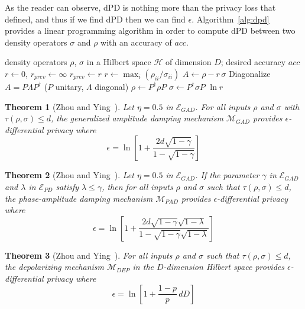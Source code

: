 \documentclass{ieeeaccess}
\newtheorem{theorem}{Theorem}[section]
\begin{document}
As the reader can observe, dPD is nothing more than the privacy loss that~\cite{dwork2014algorithmic} defined, and thus if we find dPD then we can find $\epsilon$. Algorithm~\ref{alg:dpd}~\cite{zhou2017differential} provides a linear programming algorithm in order to compute dPD between two density operators $\sigma$ and $\rho$ with an accuracy of $\mathit{acc}$. 

\begin{algorithm}[!t]
  \caption{Computing $\mathrm{dPD}$ \cite{zhou2017differential}}
  \label{alg:dpd}
  \begin{algorithmic}[1]
    \REQUIRE density operators $\rho$, $\sigma$ in a Hilbert space $\mathcal{H}$ of dimension $D$; desired accuracy $\mathit{acc}$
    \STATE $r \gets 0$, $r_{prev} \gets \infty$
      \STATE $r_{prev} \gets r$
      \STATE $r \gets \max_i (\rho_{ii}/\sigma_{ii})$
      \STATE $A \gets \rho - r\,\sigma$
      \STATE Diagonalize $A = P \Lambda P^{\dagger}$ ($P$ unitary, $\Lambda$ diagonal)
      \STATE $\rho \gets P^{\dagger} \rho P$
      \STATE $\sigma \gets P^{\dagger} \sigma P$
    \ENDWHILE
    \RETURN $\ln r$
  \end{algorithmic}
\end{algorithm}

\begin{theorem}[Zhou and Ying~\cite{zhou2017differential}]
    Let $\eta = 0.5$ in $\mathcal{E}_{GAD}$. For all inputs $\rho$ and $\sigma$ with $\tau(\rho, \sigma) \leq d$, the generalized amplitude damping mechanism $\mathcal{M}_{GAD}$ provides $\epsilon$-differential privacy where
    \[
      \epsilon = \ln\left[1 + \frac{2d\sqrt{1-\gamma}}{1-\sqrt{1-\gamma}}\right]
    \]
    \label{thm:epsilon_gad}
\end{theorem}

\begin{theorem}[Zhou and Ying~\cite{zhou2017differential}]
    Let $\eta = 0.5$ in $\mathcal{E}_{GAD}$. If the parameter $\gamma$ in $\mathcal{E}_{GAD}$ and $\lambda$ in $\mathcal{E}_{PD}$ satisfy $\lambda \leq \gamma$, then for all inputs $\rho$ and $\sigma$ such that $\tau(\rho, \sigma) \leq d$, the phase-amplitude damping mechanism $\mathcal{M}_{PAD}$ provides $\epsilon$-differential privacy where
    \[
      \epsilon = \ln\left[1 + \frac{2d\sqrt{1-\gamma}\sqrt{1-\lambda}}{1-\sqrt{1-\gamma}\sqrt{1-\lambda}}\right]
    \]
    \label{thm:epsilon_pad}
\end{theorem}

\begin{theorem}[Zhou and Ying~\cite{zhou2017differential}]
    For all inputs $\rho$ and $\sigma$ such that $\tau(\rho, \sigma) \leq d$, the depolarizing mechanism $\mathcal{M}_{DEP}$ in the $D$-dimension Hilbert space provides $\epsilon$-differential privacy where
    \[
      \epsilon = \ln\left[1 + \frac{1-p}{p}\, dD\right]
    \]
    \label{thm:epsilon_dep}
\end{theorem}
\end{document}
